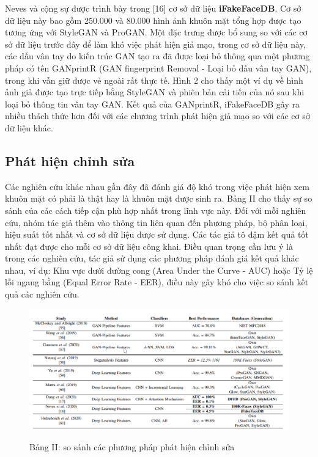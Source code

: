 \documentclass{article}
\begin{document}
Neves và cộng sự được trình bày trong [16] cơ sở dữ liệu \textbf{iFakeFaceDB}. Cơ sở dữ liệu này bao gồm 250.000 và 80.000 hình ảnh khuôn mặt tổng hợp được tạo tương ứng với StyleGAN và ProGAN. Một đặc trưng được bổ sung so với các cơ sở dữ liệu trước đây để làm khó việc phát hiện giả mạo, trong cơ sở dữ liệu này, các dấu vân tay do kiến trúc GAN tạo ra đã được loại bỏ thông qua một phương pháp có tên GANprintR (GAN fingerprint Removal - Loại bỏ dấu vân tay GAN), trong khi vẫn giữ được vẻ ngoài rất thực tế. Hình 2 cho thấy một ví dụ về hình ảnh giả được tạo trực tiếp bằng StyleGAN và phiên bản cải tiến của nó sau khi loại bỏ thông tin vân tay GAN. Kết quả của GANprintR, iFakeFaceDB gây ra nhiều thách thức hơn đối với các chương trình phát hiện giả mạo so với các cơ sở dữ liệu khác.

\subsection{Phát hiện chỉnh sửa}

Các nghiên cứu khác nhau gần đây đã đánh giá độ khó trong việc phát hiện xem khuôn mặt có phải là thật hay là khuôn mặt được sinh ra. Bảng II cho thấy sự so sánh của các cách tiếp cận phù hợp nhất trong lĩnh vực này. Đối với mỗi nghiên cứu, nhóm tác giả thêm vào thông tin liên quan đến phương pháp, bộ phân loại, hiệu suất tốt nhất và cơ sở dữ liệu được sử dụng. Các tác giả tô đậm kết quả tốt nhất đạt được cho mỗi cơ sở dữ liệu công khai. Điều quan trọng cần lưu ý là trong các nghiên cứu, tác giả sử dụng các phương pháp đánh giá kết quả khác nhau, ví dụ: Khu vực dưới đường cong (Area Under the Curve - AUC) hoặc Tỷ lệ lỗi ngang bằng (Equal Error Rate - EER), điều này gây khó cho việc so sánh kết quả các nghiên cứu.


\begin{figure}[h!]
\caption{Bảng II: so sánh các phương pháp phát hiện chỉnh sửa}
\includegraphics[width=\columnwidth]{table-2-compare}
\label{table-2-compare}
\end{figure}
\end{document}
